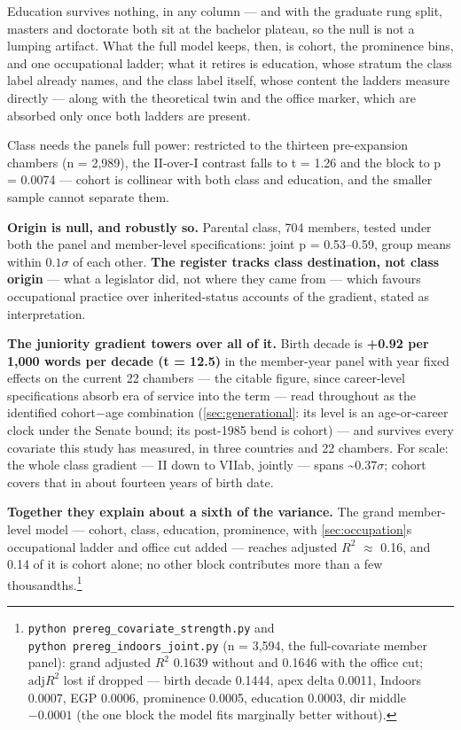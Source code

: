 Education survives nothing, in any column --- and with the graduate rung split,
master\textquotesingle s and doctorate both sit at the bachelor plateau, so the null is not a
lumping artifact. What the full model keeps, then, is cohort, the prominence
bins, and one occupational ladder; what it retires is education, whose stratum
the class label already names, and the class label itself, whose content the
ladders measure directly --- along with the theoretical twin and the office
marker, which are absorbed only once both ladders are present.

Class needs the panel\textquotesingle s full power: restricted to the thirteen
pre-expansion chambers (n = 2,989), the II-over-I contrast falls to t = 1.26
and the block to p = 0.0074 --- cohort is collinear with both class and
education, and the smaller sample cannot separate them.

\textbf{Origin is null, and robustly so.} Parental class, 704 members, tested
under both the panel and member-level specifications: joint p = 0.53--0.59,
group means within \(0.1\sigma\) of each other. \textbf{The register tracks class
destination, not class origin} --- what a legislator did, not where they came
from --- which favours occupational practice over inherited-status accounts of
the gradient, stated as interpretation.

\textbf{The juniority gradient towers over all of it.} Birth decade is
\textbf{+0.92 per 1,000 words per decade (t = 12.5)} in the member-year panel with
year fixed effects on the current 22 chambers --- the citable figure, since
career-level specifications absorb era of service into the term --- read
throughout as the identified cohort\(-\)age combination (\cref{sec:generational}: its level is an
age-or-career clock under the Senate bound; its post-1985 bend is cohort) ---
and survives every covariate this study has measured, in three countries and
22 chambers. For scale: the whole class gradient --- II down to VIIab, jointly ---
spans \textasciitilde\(0.37\sigma\); cohort covers that in about fourteen years of birth date.

\textbf{Together they explain about a sixth of the variance.} The grand member-level model --- cohort, class, education, prominence, with \cref{sec:occupation}\textquotesingle s occupational ladder and office cut added --- reaches adjusted \(R^{2}\) \(\approx\) 0.16, and 0.14 of it is cohort alone; no other block contributes more than a few thousandths.\footnote{\texttt{python\ prereg\_\allowbreak{}covariate\_\allowbreak{}strength.\allowbreak{}py} and \texttt{python\ prereg\_\allowbreak{}indoors\_\allowbreak{}joint.\allowbreak{}py} (n = 3,594, the full-covariate member panel):
  grand adjusted \(R^{2}\) 0.1639 without and 0.1646 with the office cut; \(\text{adj}R^{2}\)
  lost if dropped --- birth decade 0.1444, apex delta 0.0011, Indoors
  0.0007, EGP 0.0006, prominence 0.0005, education 0.0003, dir middle
  \(-0.0001\) (the one block the model fits marginally better without).}

